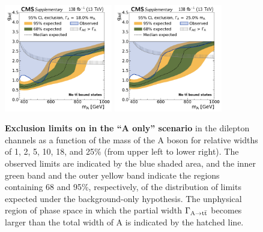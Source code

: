 \begin{figure}[!ph]
    \\
    \includegraphics[width=0.42\textwidth]{figures/ah/lim1D/smtt/ll/A_limit_w18p0_g-scan.pdf}%
    \hspace*{0.05\textwidth}%
    \includegraphics[width=0.42\textwidth]{figures/ah/lim1D/smtt/ll/A_limit_w25p0_g-scan.pdf}
    \caption{%
        \textbf{Exclusion limits on \gAtt in the ``A only'' scenario} in the dilepton channels as a function of the mass of the A boson  for relative widths of 1, 2, 5, 10, 18, and 25\% (from upper left to lower right).
        The observed limits are indicated by the blue shaded area, and the inner green band and the outer yellow band indicate the regions containing 68 and 95\%, respectively, of the distribution of limits expected under the background-only hypothesis.
        The unphysical region of phase space in which the partial width $\Gamma_{\mathrm{A \rightarrow \mathrm{t \bar{t}}}}$ becomes larger than the total width of A is indicated by the hatched line.
    }
    \label{fig:ah:limit_1D_a_smtt}
\end{figure}
    
